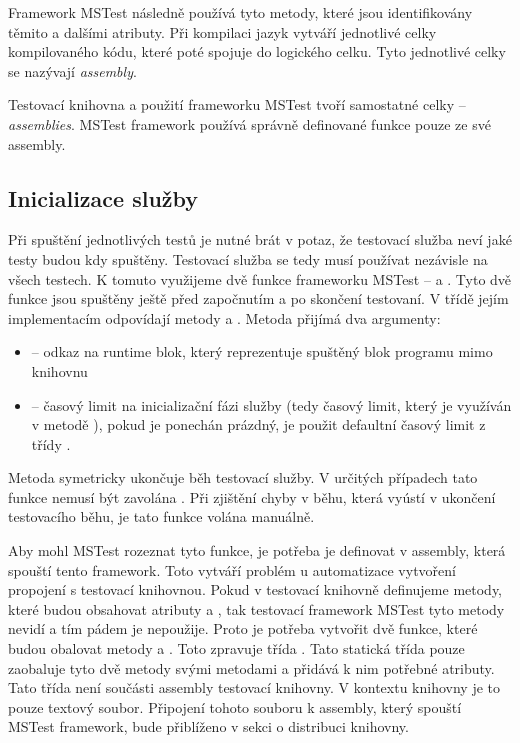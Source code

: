 Framework MSTest následně používá tyto metody, které jsou identifikovány těmito a dalšími atributy. Při kompilaci jazyk  vytváří jednotlivé celky kompilovaného kódu, které poté spojuje do logického celku. Tyto jednotlivé celky se nazývají \textit{assembly}. \cite{assembly}

Testovací knihovna a použití frameworku MSTest tvoří samostatné celky -- \textit{assemblies}. MSTest framework používá správně definované funkce pouze ze své assembly. 


\subsection{Inicializace služby}

Při spuštění jednotlivých testů je nutné brát v potaz, že testovací služba neví jaké testy budou kdy spuštěny. Testovací služba se tedy musí používat nezávisle na všech testech. K tomuto využijeme dvě funkce frameworku MSTest --  a . Tyto dvě funkce jsou spuštěny ještě před započnutím a po skončení testovaní. V třídě  jejím implementacím odpovídají metody  a . Metoda  přijímá dva argumenty:

\begin{itemize}
    \item {} -- odkaz na runtime blok, který reprezentuje spuštěný blok programu mimo knihovnu
    \item {} -- časový limit na inicializační fázi služby (tedy časový limit, který je využíván v metodě ), pokud je ponechán prázdný, je použit defaultní časový limit z třídy .
\end{itemize}

Metoda  symetricky ukončuje běh testovací služby. V určitých případech tato funkce nemusí být zavolána . Při zjištění chyby v běhu, která vyústí v ukončení testovacího běhu, je tato funkce volána manuálně.

Aby mohl MSTest rozeznat tyto funkce, je potřeba je definovat v assembly, která spouští tento framework. Toto vytváří problém u automatizace vytvoření propojení s testovací knihovnou. Pokud v testovací knihovně definujeme metody, které budou obsahovat atributy  a , tak testovací framework  MSTest tyto metody nevidí a tím pádem je nepoužije. Proto je potřeba vytvořit dvě funkce, které budou obalovat metody  a . Toto zpravuje třída . Tato statická třída pouze zaobaluje tyto dvě metody svými metodami a přidává k nim potřebné atributy. Tato třída není součásti assembly testovací knihovny. V kontextu knihovny je to pouze textový soubor. Připojení tohoto souboru k assembly, který spouští MSTest framework, bude přiblíženo v sekci o distribuci knihovny.

